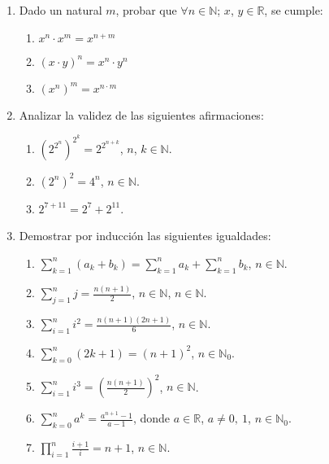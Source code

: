 \documentclass[12pt,spanish,makeidx]{amsbook}
\begin{document}
\begin{enumerate}
\smallskip




\item Dado un natural $m$, probar que $\forall n \in {\mathbb N} $; $x$, $y \in {\mathbb R}$, se cumple:
\begin{multicols}{3}
 \begin{enumerate}
  \item $x^n \cdot x^m = x^{n+m}$
\item $(x\cdot y)^n=x^n\cdot y^n$
\item $(x^n)^m = x^{n\cdot m}$
 \end{enumerate}
\end{multicols}



\smallskip

\item Analizar la validez de las siguientes afirmaciones:
 \begin{enumerate}
\item  $(2^{2^n})^{2^k} = 2^{2^{n+k}}$,  $n$, $k \in {\mathbb N}$.
\item $(2^n)^2 = 4^n$, $n \in {\mathbb N}$.
\item $2^{7+11} = 2^7 + 2^{11}$.
\end{enumerate}

\smallskip


\item Demostrar por inducción  las siguientes igualdades:
  \begin{enumerate}
  \item  $\displaystyle{ \sum_{k=1}^n (a_k + b_k) = \sum_{k=1}^n a_k + \sum_{k=1}^n b_k}$, $n\in \mathbb N$.
  \item  $\displaystyle{ \sum_{j=1}^n j = \frac{n(n+1)}{2}}$, $n\in \mathbb N$, $n\in \mathbb N$.
  \item  $\displaystyle{ \sum_{i=1}^n i^2 = \frac{n(n+1)(2n+1)}{6}}$, $n\in \mathbb N$.
  \item  $\displaystyle{ \sum_{k=0}^n (2k+1) = (n+1)^2}$, $n\in \mathbb N_0$.
  \item  $\displaystyle{ \sum_{i=1}^n i^3 = \left( \frac{n(n+1)}{2 }\right)^2}$, $n\in \mathbb N$.
  \item  $\displaystyle{ \sum_{k=0}^n a^k = \frac{a^{n+1}-1}{a-1}}$, donde $a\in {\mathbb R}$, $a \neq 0,\ 1$, $n\in \mathbb N_0$.
  \item  $\displaystyle{ \prod_{i=1}^n \frac{i+1}{i} = n+1}$, $n\in \mathbb N$.


\end{enumerate}
\end{enumerate}
\end{document}
